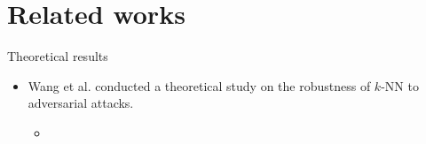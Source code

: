 \section{Related works}


\begin{frame}{Theoretical results}
  \begin{itemize}
    \item Wang et al. conducted a theoretical study on the robustness of $k$-NN to adversarial attacks.
    \begin{itemize}
        \item
    \end{itemize}
  \end{itemize}

\end{frame}
